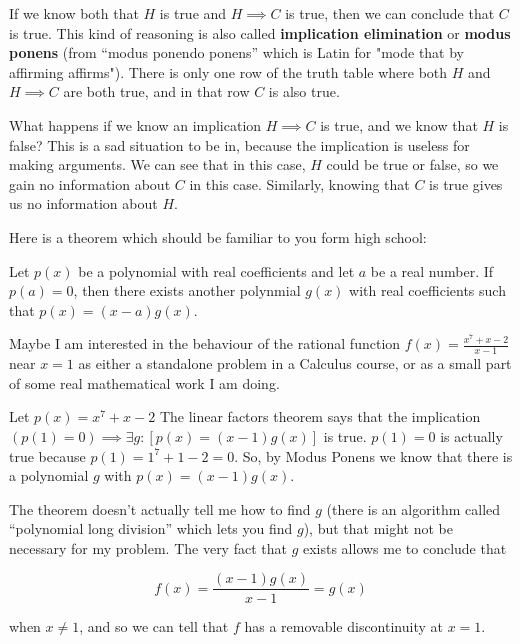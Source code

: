 If we know both that $H$ is true and $H \implies C$ is true, then we can conclude that $C$ is true.  This kind of reasoning is also called \textbf{implication elimination} or \textbf{modus ponens} (from ``modus ponendo ponens'' which is Latin for "mode that by affirming affirms"). There is only one row of the truth table where both $H$ and $H \implies C$ are both true, and in that row $C$ is also true.


What happens if we know an implication $H \implies C$ is true, and we know that $H$ is false?  This is a sad situation to be in, because the implication is useless for making arguments.  We can see that in this case, $H$ could be true or false, so we gain no information about $C$ in this case.  Similarly, knowing that $C$ is true gives us no information about $H$.

\begin{example}
		Here is a theorem which should be familiar to you form high school:
		
		\begin{theorem}
			Let $p(x)$ be a polynomial with real coefficients and let $a$ be a real number.  If $p(a) = 0$, then there exists another polynmial $g(x)$ with real coefficients such that $p(x) = (x-a)g(x)$. 
		\end{theorem}
		
		Maybe I am interested in the behaviour of the rational function $f(x) = \frac{x^7+x-2}{x-1}$ near $x=1$ as either a standalone problem in a Calculus course, or as a small part of some real mathematical work I am doing.
		
		Let $p(x) = x^7+x-2$ The linear factors theorem says that the implication $(p(1) = 0) \implies \exists g: [p(x) = (x-1)g(x)]$ is true.  $p(1) = 0$ is actually true because $p(1) = 1^7+1-2 = 0$.  So, by Modus Ponens we know that there is a polynomial $g$ with $p(x) = (x-1)g(x)$.
		
		The theorem doesn't actually tell me how to find $g$ (there is an algorithm called ``polynomial long division'' which lets you find $g$), but that might not be necessary for my problem.  The very fact that $g$ exists allows me to conclude that
		
		$$f(x) = \frac{(x-1)g(x)}{x-1} = g(x)$$
		
		when $x \neq 1$, and so we can tell that $f$ has a removable discontinuity at $x=1$.
		
	\end{example}

